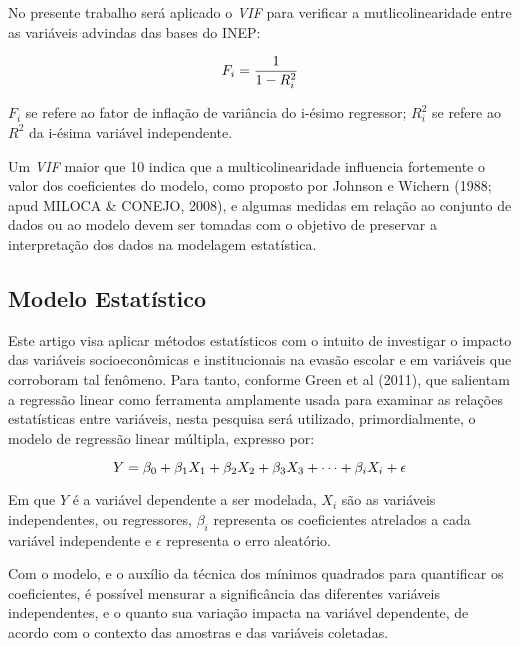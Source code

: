 \documentclass[english, spanish, brazilian]{RBIEarticle} %
\begin{document}
No presente trabalho será aplicado o \textit{VIF} para verificar a mutlicolinearidade entre as variáveis advindas das bases do INEP:

\vspace{0.5cm}
\begin{equation}
\large F_i = \frac{1}{1-R_i^2}
\end{equation}
\vspace{0.5cm}


$F_i$ se refere ao fator de inflação de variância do i-ésimo regressor; $R_i^2$ se refere ao $R^2$ da i-ésima variável independente.

Um \textit{VIF} maior que 10 indica que a multicolinearidade influencia fortemente o valor dos coeficientes do modelo, como proposto por Johnson e Wichern (1988; apud MILOCA \& CONEJO, 2008), e algumas medidas em relação ao conjunto de dados ou ao modelo devem ser tomadas com o objetivo de preservar a interpretação dos dados na modelagem estatística.

\subsection{Modelo Estatístico}
Este artigo visa aplicar métodos estatísticos com o intuito de investigar o impacto das variáveis socioeconômicas e institucionais na evasão escolar e em variáveis que corroboram tal fenômeno. Para tanto, conforme Green et al (2011), que salientam a regressão linear como ferramenta amplamente usada para examinar as relações estatísticas entre variáveis, nesta pesquisa será utilizado, primordialmente, o modelo de regressão linear múltipla, expresso por:

\vspace{0.5cm}
\begin{equation}
\large Y = \beta_0 + \beta_1X_1 + \beta_2X_2 + \beta_3X_3 + \cdots + \beta_iX_i + \epsilon 
\end{equation}
\vspace{0.5cm}

Em que $Y$ é a variável dependente a ser modelada, $X_i$ são as variáveis independentes, ou regressores, $\beta_i$ representa os coeficientes atrelados a cada variável independente e $\epsilon$ representa o erro aleatório. 

Com o modelo, e o auxílio da técnica dos mínimos quadrados para quantificar os coeficientes, é possível mensurar a significância das diferentes variáveis independentes, e o quanto sua variação impacta na variável dependente, de acordo com o contexto das amostras e das variáveis coletadas.
\end{document}
